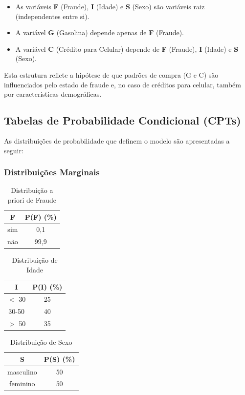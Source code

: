 \documentclass[a4paper,12pt]{article}
\begin{document}
\begin{itemize}
    \item As variáveis \textbf{F} (Fraude), \textbf{I} (Idade) e \textbf{S} (Sexo) são variáveis raiz (independentes entre si).
    \item A variável \textbf{G} (Gasolina) depende apenas de \textbf{F} (Fraude).
    \item A variável \textbf{C} (Crédito para Celular) depende de \textbf{F} (Fraude), \textbf{I} (Idade) e \textbf{S} (Sexo).
\end{itemize}

Esta estrutura reflete a hipótese de que padrões de compra (G e C) são influenciados pelo estado de fraude e, no caso de créditos para celular, também por características demográficas.

\subsection{Tabelas de Probabilidade Condicional (CPTs)}

As distribuições de probabilidade que definem o modelo são apresentadas a seguir:

\subsubsection{Distribuições Marginais}

\begin{table}[H]
\centering
\begin{tabular}{|c|c|}
\hline
\textbf{F} & \textbf{P(F)} (\%) \\
\hline
sim & 0,1 \\
não & 99,9 \\
\hline
\end{tabular}
\caption{Distribuição a priori de Fraude}
\end{table}

\begin{table}[H]
\centering
\begin{tabular}{|c|c|}
\hline
\textbf{I} & \textbf{P(I)} (\%) \\
\hline
$<$ 30 & 25 \\
30-50 & 40 \\
$>$ 50 & 35 \\
\hline
\end{tabular}
\caption{Distribuição de Idade}
\end{table}

\begin{table}[H]
\centering
\begin{tabular}{|c|c|}
\hline
\textbf{S} & \textbf{P(S)} (\%) \\
\hline
masculino & 50 \\
feminino & 50 \\
\hline
\end{tabular}
\caption{Distribuição de Sexo}
\end{table}
\end{document}

